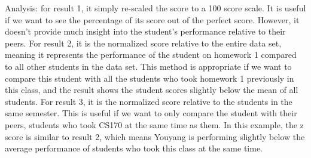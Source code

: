 \documentclass[9pt,twoside]{exam}
\begin{document}
Analysis: for result 1, it simply re-scaled the score to a 100 score scale. It is useful if we want to see the percentage of its score out of the perfect score. However, it doesn't provide much insight into the student's performance relative to their peers. For result 2, it is the normalized score relative to the entire data set, meaning it represents the performance of the student on homework 1 compared to all other students in the data set. This method is appropriate if we want to compare this student with all the students who took homework 1 previously in this class, and the result shows the student scores slightly below the mean of all students. For result 3, it is the normalized score relative to the students in the same semester. This is useful if we want to only compare the student with their peers, students who took CS170 at the same time as them. In this example, the z score is similar to result 2, which means Youyang is performing slightly below the average performance of students who took this class at the same time.
\end{document}
